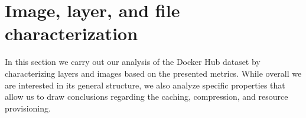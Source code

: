 \section{Image, layer, and file characterization}
\label{sec:char}

In this section we carry out our analysis of the Docker Hub dataset by characterizing
layers and images based on
the presented metrics. While overall we are interested in its general structure,
we also analyze specific properties that allow us to draw conclusions regarding the
caching, compression, and resource provisioning.







